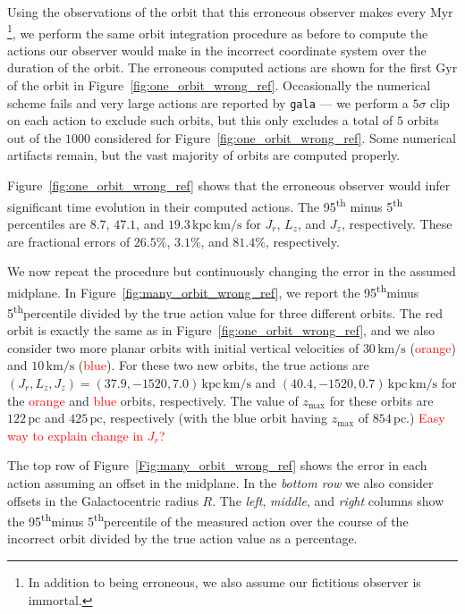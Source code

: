 \documentclass[twocolumn]{aastex62}
\newcommand{\Gus}[1]{\textcolor{red}{#1}}
\newcommand{\pc}{\text{pc}}
\newcommand{\Myr}{\text{Myr}}
\newcommand{\Gyr}{\text{Gyr}}
\newcommand{\kms}{\text{km}/\text{s}}
\newcommand{\actunit}{\text{kpc}\,\kms}
\newcommand{\uth}{\textsuperscript{th}}
\begin{document}
Using the observations of the orbit that this erroneous observer makes every
$\Myr$\footnote{In addition to being erroneous, we also assume our fictitious
observer is immortal.}, we perform the same orbit integration procedure as
before to compute the actions our observer would make in the incorrect
coordinate system over the duration of the orbit. The erroneous computed
actions are shown for the first $\Gyr$ of the orbit in
Figure~\ref{fig:one_orbit_wrong_ref}. Occasionally the numerical scheme fails
and very large actions are reported by \texttt{gala}
--- we perform a $5\sigma$ clip on each action to exclude such orbits, but
this only excludes a total of $5$ orbits out of the $1000$ considered for
Figure~\ref{fig:one_orbit_wrong_ref}. Some numerical artifacts remain, but the
vast majority of orbits are computed properly.

Figure~\ref{fig:one_orbit_wrong_ref} shows that the erroneous observer would
infer significant time evolution in their computed actions. The
95\textsuperscript{th} minus 5\textsuperscript{th} percentiles are $8.7$,
$47.1$, and $19.3\,\actunit$ for $J_r$, $L_z$, and $J_z$, respectively. These
are fractional errors of $26.5\%$, $3.1\%$, and $81.4\%$, respectively.

\begin{figure*}
\caption{Caption.}
\label{fig:one_orbit_wrong_ref}
\end{figure*}

We now repeat the procedure but continuously changing the error in the assumed
midplane. In Figure~\ref{fig:many_orbit_wrong_ref}, we report the 95\uth minus
5\uth percentile divided by the true action value for three different orbits.
The red orbit is exactly the same as in Figure~\ref{fig:one_orbit_wrong_ref},
and we also consider two more planar orbits with initial vertical velocities
of $30\,\kms$ (\Gus{orange}) and $10\,\kms$ (\Gus{blue}). For these two new
orbits, the true actions are $(J_r, L_z, J_z) = (37.9, -1520, 7.0)\,\actunit$
and $(40.4, -1520, 0.7)\,\actunit$ for the \Gus{orange} and \Gus{blue} orbits,
respectively. The value of $z_{\text{max}}$ for these orbits are $122\,\pc$
and $425\,\pc$, respectively (with the blue orbit having $z_{\text{max}}$ of
$854\,\pc$.) \Gus{Easy way to explain change in $J_r$?}

The top row of Figure~\ref{Fig:many_orbit_wrong_ref} shows the error in each
action assuming an offset in the midplane. In the {\em bottom row} we also
consider offsets in the Galactocentric radius $R$. The {\em left}, {\em
middle}, and {\em right} columns show the 95\uth minus 5\uth percentile of the
measured action over the course of the incorrect orbit divided by the true
action value as a percentage. 
\end{document}

